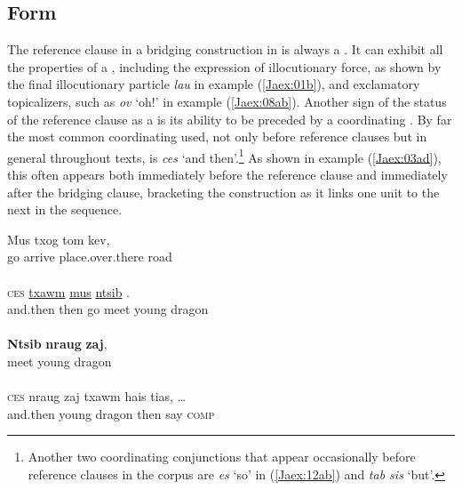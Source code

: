 \documentclass[output=paper]{LSP/langsci}
\begin{document}
\subsection{Form}
\label{JaForm}

The reference clause in a bridging construction in  is always a . It can exhibit all the properties of a , including the expression of illocutionary force, as shown by the final illocutionary particle \textit{lau} in example (\ref{Jaex:01b}), and exclamatory topicalizers, such as \textit{ov} `oh!' in example (\ref{Jaex:08ab}). Another sign of the status of the reference clause as a  is its ability to be preceded by a coordinating . 
%
%
By far the most common coordinating  used, not only before reference clauses but in general throughout  texts, is \textit{ces} `and then'.\footnote{ Another two coordinating conjunctions that appear occasionally before reference clauses in the corpus are \textit{es} `so' in (\ref{Jaex:12ab})  and \textit{tab sis } `but'.} As shown in example (\ref{Jaex:03ad}), this  often appears both immediately before the reference clause and immediately after the bridging clause, bracketing the construction as it links one unit to the next in the  sequence.
%

\begin{exe}
\ex \label{Jaex:03ad}
\begin{xlist}
\ex \label{Jaex:03a}
\gll Mus txog tom kev,\\
go  arrive place.over.there road\\
\glt {}\\
\ex \label{Jaex:03b}
\gll \textsc{ces} \underline{txawm} \underline{mus} \underline{ntsib} \underline{} \underline{}.\\
and.then then go meet young dragon\\ 
\glt {}\\
\ex \label{Jaex:03c}
\gll \textbf{Ntsib} \textbf{nraug} \textbf{zaj},\\		
 meet young dragon \\ 
\glt {}\\
\ex \label{Jaex:03d}
\gll \textsc{ces} nraug zaj txawm hais tias, …\\     	      
and.then  young dragon then  say \textsc{comp}\\
\glt {} \citep[][163]{johnson92}
\end{xlist}
\end{exe}
\end{document}
